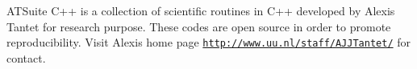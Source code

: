 A\+T\+Suite C++ is a collection of scientific routines in C++ developed by Alexis Tantet for research purpose. These codes are open source in order to promote reproducibility. Visit Alexis\textquotesingle{} home page \href{http://www.uu.nl/staff/AJJTantet/}{\tt http\+://www.\+uu.\+nl/staff/\+A\+J\+J\+Tantet/} for contact. 